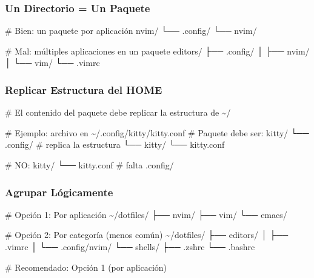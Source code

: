 \documentclass[
  doc,
  floatsintext,
  longtable,
  a4paper,
  nolmodern,
  notxfonts,
  notimes,
  12pt,
  colorlinks=true,linkcolor=blue,citecolor=blue,urlcolor=blue]{apa7}
\newenvironment{Shaded}{\begin{snugshade}}{\end{snugshade}}
\newcommand{\CommentTok}[1]{\textcolor[rgb]{0.37,0.37,0.37}{#1}}
\newcommand{\ExtensionTok}[1]{\textcolor[rgb]{0.00,0.23,0.31}{#1}}
\newcommand{\NormalTok}[1]{\textcolor[rgb]{0.00,0.23,0.31}{#1}}
\begin{document}
\subsubsection{Un Directorio = Un
Paquete}\label{un-directorio-un-paquete}

\begin{Shaded}
\begin{Highlighting}[]
\CommentTok{\# Bien: un paquete por aplicación}
\ExtensionTok{nvim/}
  \ExtensionTok{└──}\NormalTok{ .config/}
      \ExtensionTok{└──}\NormalTok{ nvim/}

\CommentTok{\# Mal: múltiples aplicaciones en un paquete}
\ExtensionTok{editors/}
  \ExtensionTok{├──}\NormalTok{ .config/}
  \ExtensionTok{│}\NormalTok{   ├── nvim/}
  \ExtensionTok{│}\NormalTok{   └── vim/}
  \ExtensionTok{└──}\NormalTok{ .vimrc}
\end{Highlighting}
\end{Shaded}

\subsubsection{Replicar Estructura del
HOME}\label{replicar-estructura-del-home}

\begin{Shaded}
\begin{Highlighting}[]
\CommentTok{\# El contenido del paquete debe replicar la estructura de \textasciitilde{}/}

\CommentTok{\# Ejemplo: archivo en \textasciitilde{}/.config/kitty/kitty.conf}
\CommentTok{\# Paquete debe ser:}
\ExtensionTok{kitty/}
  \ExtensionTok{└──}\NormalTok{ .config/              }\CommentTok{\# replica la estructura}
      \ExtensionTok{└──}\NormalTok{ kitty/}
          \ExtensionTok{└──}\NormalTok{ kitty.conf}

\CommentTok{\# NO:}
\ExtensionTok{kitty/}
  \ExtensionTok{└──}\NormalTok{ kitty.conf            }\CommentTok{\# falta .config/}
\end{Highlighting}
\end{Shaded}

\subsubsection{Agrupar Lógicamente}\label{agrupar-luxf3gicamente}

\begin{Shaded}
\begin{Highlighting}[]
\CommentTok{\# Opción 1: Por aplicación}
\ExtensionTok{\textasciitilde{}/dotfiles/}
\ExtensionTok{├──}\NormalTok{ nvim/}
\ExtensionTok{├──}\NormalTok{ vim/}
\ExtensionTok{└──}\NormalTok{ emacs/}

\CommentTok{\# Opción 2: Por categoría (menos común)}
\ExtensionTok{\textasciitilde{}/dotfiles/}
\ExtensionTok{├──}\NormalTok{ editors/}
\ExtensionTok{│}\NormalTok{   ├── .vimrc}
\ExtensionTok{│}\NormalTok{   └── .config/nvim/}
\ExtensionTok{└──}\NormalTok{ shells/}
    \ExtensionTok{├──}\NormalTok{ .zshrc}
    \ExtensionTok{└──}\NormalTok{ .bashrc}

\CommentTok{\# Recomendado: Opción 1 (por aplicación)}
\end{Highlighting}
\end{Shaded}
\end{document}
